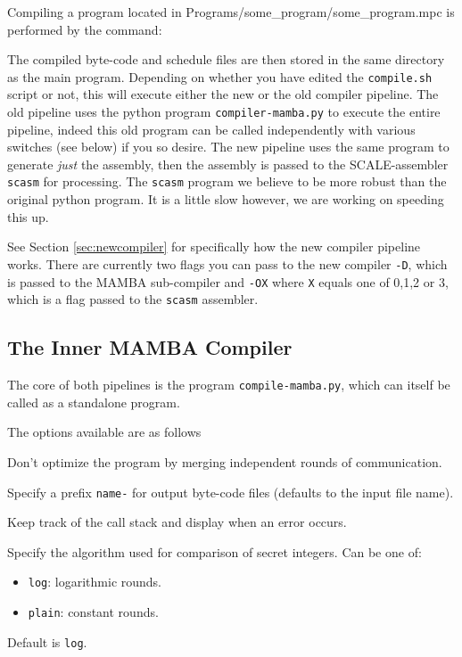 Compiling a program located in Programs/some\_program/some\_program.mpc is performed by the
command:


\noindent The compiled byte-code and schedule files are then stored in the
same directory as the main program.
Depending on whether you have edited the \verb+compile.sh+ script or
not, this will execute either the new or the old compiler pipeline.
The old pipeline uses the python program \verb+compiler-mamba.py+ to
execute the entire pipeline, indeed this old program can be called independently
with various switches (see below) if you so desire.
The new pipeline uses the same program to generate {\em just} the
assembly, then the assembly is passed to the SCALE-assembler \verb+scasm+ for
processing. The \verb+scasm+ program we believe to be more robust than the
original python program. It is a little slow however, we are working on
speeding this up.

See Section \ref{sec:newcompiler} for specifically how the new
compiler pipeline works.
There are currently two flags you can pass to the new compiler
\verb+-D+, which is passed to the MAMBA sub-compiler and
\verb+-OX+ where \verb+X+ equals one of 0,1,2 or 3, which is
a flag passed to the \verb+scasm+ assembler.

\subsection{The Inner MAMBA Compiler}
The core of both pipelines is the program \verb+compile-mamba.py+,
which can itself be called as a standalone program.


\noindent
The options available are as follows

Don't optimize the program by merging independent rounds of communication.

Specify a prefix \verb|name-| for output byte-code files (defaults to the input file name).

Keep track of the call stack and display when an error occurs.

Specify the algorithm used for comparison of secret integers. Can be one of:
\begin{itemize}
\item \verb|log|: logarithmic rounds.
\item \verb|plain|: constant rounds.
\end{itemize}
Default is \verb|log|.

